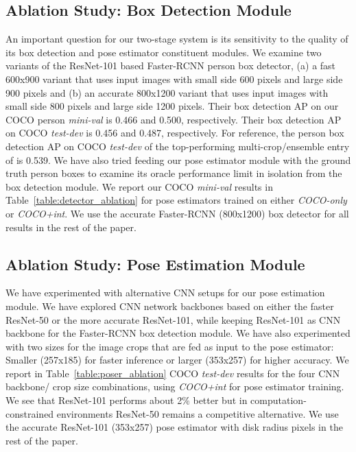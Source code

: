 \documentclass[10pt,twocolumn,letterpaper]{article}
\begin{document}
\subsection{Ablation Study: Box Detection Module}

An important question for our two-stage system is its sensitivity to the quality of its box detection and pose estimator constituent modules. We examine two variants of the ResNet-101 based Faster-RCNN person box detector, (a) a fast 600x900 variant that uses input images with small side 600 pixels and large side 900 pixels and (b) an accurate 800x1200 variant that uses input images with small side 800 pixels and large side 1200 pixels. Their box detection AP on our COCO person \emph{mini-val} is 0.466 and 0.500, respectively. Their box detection AP on COCO \emph{test-dev} is 0.456 and 0.487, respectively. For reference, the person box detection AP on COCO \emph{test-dev} of the top-performing multi-crop/ensemble entry of \cite{huang2016speed} is 0.539. We have also tried feeding our pose estimator module with the ground truth person boxes to examine its oracle performance limit in isolation from the box detection module. We report our COCO \emph{mini-val} results in Table~\ref{table:detector_ablation} for pose estimators trained on either \emph{COCO-only} or \emph{COCO+int}. We use the accurate Faster-RCNN (800x1200) box detector for all results in the rest of the paper.

\subsection{Ablation Study: Pose Estimation Module}

We have experimented with alternative CNN setups for our pose estimation module. We have explored CNN network backbones based on either the faster ResNet-50 or the more accurate ResNet-101, while keeping ResNet-101 as CNN backbone for the Faster-RCNN box detection module. We have also experimented with two sizes for the image crops that are fed as input to the pose estimator: Smaller (257x185) for faster inference or larger (353x257) for higher accuracy. We report in Table~\ref{table:poser_ablation} COCO \emph{test-dev} results for the four CNN backbone/ crop size combinations, using \emph{COCO+int} for pose estimator training. We see that ResNet-101 performs about 2\% better but in computation-constrained environments ResNet-50 remains a competitive alternative. We use the accurate ResNet-101 (353x257) pose estimator with disk radius  pixels in the rest of the paper.
\end{document}
